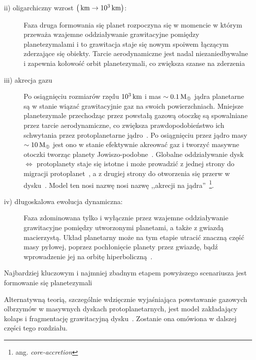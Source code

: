 \begin{description}
\item[ii) oligarchiczny wzrost $\left(\hbox{$\thinspace\textrm{km}$} \rightarrow
   10^3\hbox{$\thinspace\textrm{km}$}\right)$:]
   Faza druga formowania się planet rozpoczyna się w momencie w którym przeważa
   wzajemne oddziaływanie grawitacyjne pomiędzy planetezymalami i to grawitacja
   staje się nowym spoiwem łączącym zderzające się obiekty. Tarcie
   aerodynamiczne jest nadal niezaniedbywalne i zapewnia kołowość orbit
   planetezymali, co zwiększa szanse na zderzenia~\cite{KI98}
\item[iii) akrecja gazu]
   Po osiągnięciu rozmiarów rzędu $10^3\hbox{$\thinspace\textrm{km}$}$ i mas $\sim 0.1\hbox{$\mathrm{\thinspace M_{\oplus}}$}$ jądra
   planetarne są w stanie wiązać grawitacyjnie gaz na swoich powierzchniach.
   Mniejsze planetezymale przechodząc przez powstałą gazową otoczkę są
   spowalniane przez tarcie aerodynamiczne, co zwiększa prawdopodobieństwo ich
   schwytania przez protoplanetarne jądro~\cite{II03}. Po osiągnięciu przez
   jądro masy $\sim 10\hbox{$\mathrm{\thinspace M_{\oplus}}$}$ jest ono w stanie efektywnie akreować gaz i
   tworzyć masywne otoczki tworząc planety Jowiszo-podobne~\cite{Petal96}.
   Globalne oddziaływanie dysk $\iff$ protoplanety staje się istotne i może
   prowadzić z jednej strony do migracji protoplanet~\cite{Papa07}, a z drugiej
   strony do otworzenia się przerw w dysku~\citep{KKI06}. Model ten nosi nazwę
   nosi nazwę ,,akrecji na jądra''~\footnote{ang. \emph{core-accretion}}. 

\item[iv) długoskalowa ewolucja dynamiczna:]
   Faza zdominowana tylko i wyłącznie przez wzajemne oddziaływanie grawitacyjne
   pomiędzy utworzonymi planetami, a także z gwiazdą macierzystą. Układ
   planetarny może na tym etapie utracić znaczną część masy pyłowej, poprzez
   pochłonięcie planety przez gwiazdę, bądź wprowadzenie jej na orbitę
   hiperboliczną~\cite{DDA13}.
\end{description}
Najbardziej kluczowym i najmniej zbadnym etapem powyższego scenariusza jest
formowanie się planetezymali

Alternatywną teorią, szczególnie
wdzięcznie wyjaśniająca powstawanie gazowych olbrzymów w masywnych dyskach
protoplanetarnych, jest model zakładający kolaps i fragmentację grawitacyjną
dysku~\cite{Boss97}. Zostanie ona omówiona w dalszej części tego rozdziału.

